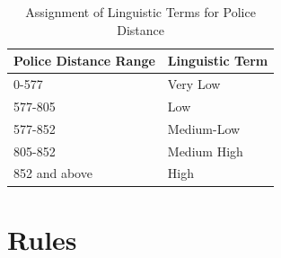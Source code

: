 \documentclass[10pt, conference, compsocconf]{IEEEtran}
\begin{document}
\begin{table}[htbp]
	\centering
	\caption{Assignment of Linguistic Terms for Police Distance}
	\begin{tabular}{|l|l|}
		\hline
		\textbf{Police Distance Range} & \textbf{Linguistic Term} \\
		\hline
		0-577 & Very Low \\
		\hline
		577-805 & Low \\
		\hline
		577-852 & Medium-Low \\
		\hline
		805-852 & Medium High \\
		\hline
		852 and above & High \\
		\hline
	\end{tabular}
	\label{tab:linguistic_terms_police}
\end{table}

	
	
	\section{Rules}
	
\end{document}
